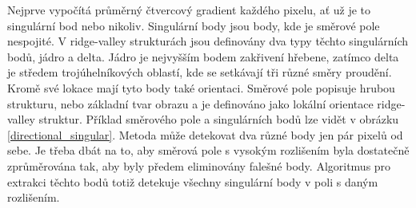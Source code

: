 Nejprve vypočítá průměrný čtvercový gradient každého pixelu, ať už je to singulární bod nebo nikoliv. Singulární body jsou body, kde je směrové pole nespojité. V ridge-valley strukturách jsou definovány dva typy těchto singulárních bodů, jádro a delta. Jádro je nejvyšším bodem zakřivení hřebene, zatímco delta je středem trojúhelníkových oblastí, kde se setkávají tři různé směry proudění. Kromě své lokace mají tyto body také orientaci. Směrové pole popisuje hrubou strukturu, nebo základní tvar obrazu a je definováno jako lokální orientace ridge-valley struktur. Příklad směrového pole a singulárních bodů lze vidět v obrázku \ref{directional_singular}. Metoda může detekovat dva různé body jen pár pixelů od sebe. Je třeba dbát na to, aby směrová pole s vysokým rozlišením byla dostatečně zprůměrována tak, aby byly předem eliminovány falešné body. Algoritmus pro extrakci těchto bodů totiž detekuje všechny singulární body v poli s daným rozlišením.

